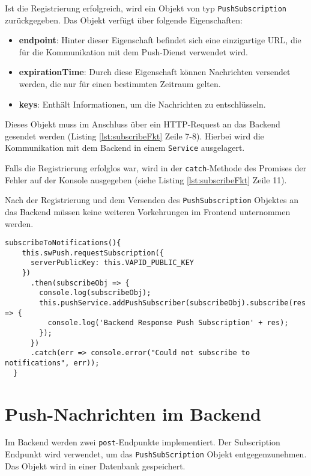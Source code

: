 Ist die Registrierung erfolgreich, wird ein Objekt von typ \texttt{PushSubscription} zurückgegeben. 
Das Objekt verfügt über folgende Eigenschaften: 
\begin{itemize}
    \item \textbf{endpoint}: Hinter dieser Eigenschaft befindet sich eine einzigartige URL, die für die Kommunikation mit dem Push-Dienst verwendet wird. 
    \item \textbf{expirationTime}: Durch diese Eigenschaft können Nachrichten versendet werden, die nur für einen bestimmten Zeitraum gelten. 
    \item \textbf{keys}: Enthält Informationen, um die Nachrichten zu entschlüsseln. 
\end{itemize}
Dieses Objekt muss im Anschluss über ein HTTP-Request an das Backend gesendet werden (Listing \ref{lst:subscribeFkt} Zeile 7-8). Hierbei wird die Kommunikation mit dem Backend in einem \texttt{Service} ausgelagert. 

Falls die Registrierung erfolglos war, wird in der \texttt{catch}-Methode des Promises der Fehler auf der Konsole ausgegeben (siehe Listing \ref{lst:subscribeFkt} Zeile 11). 

Nach der Registrierung und dem Versenden des \texttt{PushSubscription} Objektes an das Backend müssen keine weiteren Vorkehrungen im Frontend unternommen werden. 

\begin{lstlisting}[caption={Funktion zur Registrierung beim Push-Dienst},label = lst:subscribeFkt,  float=!htb]
subscribeToNotifications(){
    this.swPush.requestSubscription({
      serverPublicKey: this.VAPID_PUBLIC_KEY
    })
      .then(subscribeObj => {
        console.log(subscribeObj);
        this.pushService.addPushSubscriber(subscribeObj).subscribe(res => {
          console.log('Backend Response Push Subscription' + res);
        });
      })
      .catch(err => console.error("Could not subscribe to notifications", err));
  }
\end{lstlisting}

\newpage
\section{Push-Nachrichten im Backend}

Im Backend werden zwei \texttt{post}-Endpunkte implementiert. Der Subscription Endpunkt wird verwendet, um das \texttt{PushSubScription} Objekt entgegenzunehmen. Das Objekt wird in einer Datenbank gespeichert. 

